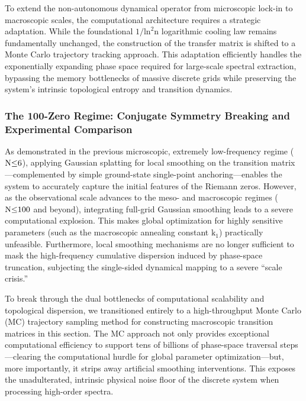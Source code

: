 \documentclass[fleqn,10pt]{wlscirep}
\begin{document}
To extend the non-autonomous dynamical operator from microscopic lock-in
to macroscopic scales, the computational architecture requires a
strategic adaptation. While the foundational
\(\text{1/}\text{ln}^{\text{2}}\text{n}\) logarithmic cooling law
remains fundamentally unchanged, the construction of the transfer matrix
is shifted to a Monte Carlo trajectory tracking approach. This
adaptation efficiently handles the exponentially expanding phase space
required for large-scale spectral extraction, bypassing the memory
bottlenecks of massive discrete grids while preserving the system's
intrinsic topological entropy and transition dynamics.

\subsubsection*{The 100-Zero Regime: Conjugate Symmetry Breaking and Experimental Comparison}

As demonstrated in the previous microscopic, extremely low-frequency
regime (\(\text{N}\text{\ensuremath{\le}6}\)), applying Gaussian splatting for local
smoothing on the transition matrix---complemented by simple ground-state
single-point anchoring---enables the system to accurately capture the
initial features of the Riemann zeros. However, as the observational
scale advances to the meso- and macroscopic regimes
(\(\text{N}\text{\ensuremath{\le}100}\) and beyond), integrating full-grid Gaussian
smoothing leads to a severe computational explosion. This makes
global optimization for highly sensitive parameters (such as the
macroscopic annealing constant \(\text{k}_{\text{1}}\)) practically
unfeasible. Furthermore, local smoothing mechanisms are no longer
sufficient to mask the high-frequency cumulative dispersion induced by
phase-space truncation, subjecting the single-sided dynamical mapping to
a severe ``scale crisis.''

To break through the dual bottlenecks of computational scalability and
topological dispersion, we transitioned entirely to a high-throughput
Monte Carlo (MC) trajectory sampling method for constructing macroscopic
transition matrices in this section. The MC approach not only provides
exceptional computational efficiency to support tens of billions of
phase-space traversal steps---clearing the computational hurdle for
global parameter optimization---but, more importantly, it strips away
artificial smoothing interventions. This exposes the unadulterated,
intrinsic physical noise floor of the discrete system when processing
high-order spectra.
\end{document}
